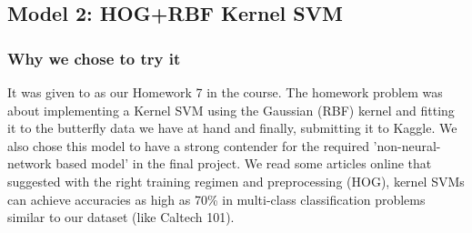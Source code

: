 \documentclass[10pt]{article} %
\begin{document}
\subsection{Model 2: HOG+RBF Kernel SVM}
\subsubsection{Why we chose to try it}
It was given to as our Homework 7 in the course. The homework problem was about implementing a Kernel SVM using the Gaussian (RBF) kernel and fitting it to the butterfly data we have at hand and finally, submitting it to Kaggle. We also chose this model to have a strong contender for the required 'non-neural-network based model' in the final project. We read some articles online that suggested with the right training regimen and preprocessing (HOG), kernel SVMs can achieve accuracies as high as 70\% in multi-class classification problems similar to our dataset (like Caltech 101).
\end{document}
